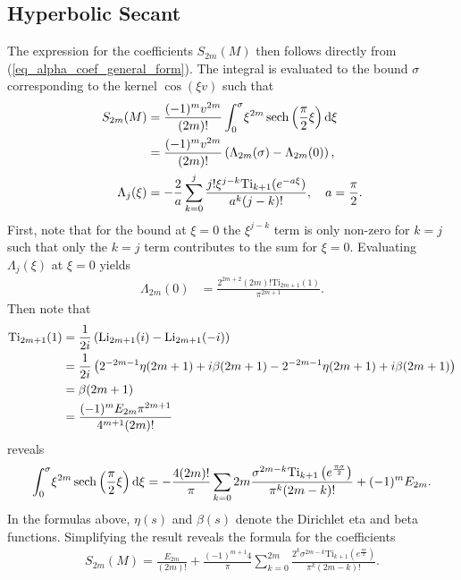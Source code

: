 \subsection{Hyperbolic Secant}
The expression for the coefficients $S_{2m}(M)$
then follows directly from (\ref{eq_alpha_coef_general_form}).
The integral is evaluated to the bound $\sigma$ corresponding to
the kernel $\cos(\xi v)$ such that
\begin{align}
	S_{2m}(M) &= \frac{(-1)^m v^{2m}}{(2m)!}
	            \int_0^{\sigma} \! \xi^{2m} \operatorname{sech}\left(\frac{\pi}{2}\xi\right)
	            \mathrm{d}\xi \\
	          &= \frac{(-1)^m v^{2m}}{(2m)!}
	          \left(
	          \Lambda_{2m}(\sigma) - \Lambda_{2m}(0)
	          \right), \\
	\Lambda_j(\xi) &= -\frac{2}{a}\sum_{k=0}^{j}
	\frac{j! \xi^{j-k} \mathrm{Ti}_{k+1}(e^{-a\xi})}{a^k (j-k)!},\quad a = \frac{\pi}{2}.\nonumber
\end{align}
First, note that for the bound at $\xi = 0$ the $\xi^{j-k}$ term
is only non-zero for $k = j$ such that only the $k=j$ term contributes
to the sum for $\xi=0$. 
Evaluating $\Lambda_j(\xi)$ at $\xi=0$ yields
\begin{align}
	\Lambda_{2m}(0) &= \frac{2^{2m+2}(2m)!\mathrm{Ti}_{2m+1}(1)}{\pi^{2m+1}}.
\end{align}
Then note that
\begin{align}
	\mathrm{Ti}_{2m+1}(1) &= \frac{1}{2i}\left(
	    \operatorname{Li}_{2m+1}(i) - \operatorname{Li}_{2m+1}(-i)
	\right) \\
	&= \frac{1}{2i}\left(
	    2^{-2m-1}\eta(2m+1) + i\beta(2m+1)
	        -2^{-2m-1}\eta(2m+1) + i\beta(2m+1)
	\right) \\
	&= \beta(2m+1) \\
	&= \frac{(-1)^mE_{2m}\pi^{2m+1}}{4^{m+1}(2m)!}
\end{align}
reveals
\begin{align}
	\int_0^{\sigma} \! \xi^{2m}\operatorname{sech}\left(\frac{\pi}{2}\xi\right) \mathrm{d}\xi
	    = -\frac{4 (2m)!}{\pi} \sum_{k=0}{2m}
	            \frac{\sigma^{2m-k} \mathrm{Ti}_{k+1}\left(e^{\frac{\pi\sigma}{2}}\right)}{\pi^k (2m-k)!}
	            + (-1)^m E_{2m}.
\end{align}
In the formulas above, $\eta(s)$ and $\beta(s)$ denote the Dirichlet eta and beta functions.
Simplifying the result reveals the formula for the coefficients
\begin{align}
	S_{2m}(M) =
	    \frac{E_{2m}}{(2m)!}
	    + \frac{(-1)^{m+1}4}{\pi}
	      \sum_{k=0}^{2m}
	      \frac{2^k \sigma^{2m-k} \mathrm{Ti}_{k+1}\left(e^{\frac{\pi\sigma}{2}}\right)}
	           {\pi^k (2m-k)!}.
\end{align}


